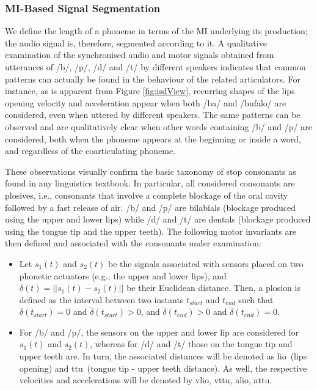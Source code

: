 \documentclass[10pt]{article}
\newcommand{\lio}{\textsf{lio}}
\newcommand{\ttu}{\textsf{ttu}}
\newcommand{\vlio}{\textsf{vlio}}
\newcommand{\vttu}{\textsf{vttu}}
\newcommand{\alio}{\textsf{alio}}
\newcommand{\attu}{\textsf{attu}}
\begin{document}
\subsubsection*{MI-Based Signal Segmentation}
\label{subsec:segm}

We define the length of a phoneme in terms of the MI underlying its production;
the audio signal is, therefore, segmented according to it.
A qualitative examination of the synchronised audio and motor
signals obtained from utterances of /b/, /p/, /d/ and /t/
by different speakers indicates that common patterns can
actually be found in the behaviour of the related articulators.
For instance, as is apparent from Figure \ref{fig:isdView}, 
recurring shapes of the lips opening velocity and acceleration appear
when both /ba/ and /bufalo/ are considered, even when uttered by different
speakers. The same patterns can be observed and are qualitatively clear when other
words containing /b/ and /p/ are considered, both when the phoneme appears at the
beginning or inside a word, and regardless of the coarticulating phoneme.

These observations visually confirm the basic taxonomy of stop consonants 
as found in any linguistics textbook. In particular, all considered consonants are plosives,
i.e., consonants that involve a complete blockage of the oral cavity followed by a fast
release of air. /b/ and /p/ are bilabials (blockage produced using the upper and lower lips)
while /d/ and /t/ are dentals (blockage produced using the tongue tip and the upper teeth).
The following motor invariants are then defined and associated with the consonants under
examination:

\begin{itemize}

  \item Let $s_1(t)$ and $s_2(t)$ be the signals associated
    with sensors placed on two phonetic actuators (e.g., the upper and
    lower lips), and $\delta(t) = ||s_1(t)-s_2(t)||$ be their
    Euclidean distance. Then, a plosion is defined as the interval
    between two instants $t_{start}$ and $t_{end}$ such that
    $\dot{\delta}(t_{start}) = 0 $ and $\ddot{\delta}(t_{start}) > 0$,
    and $\dot{\delta}(t_{end}) > 0 $ and $\ddot{\delta}(t_{end}) = 0$.

  \item For /b/ and /p/, the sensors on the upper and lower
    lip are considered for $s_1(t)$ and $s_2(t)$, whereas for /d/ and /t/
    those on the tongue tip and upper teeth are. In turn, the associated
    distances will be denoted as \lio\ (lips opening) and \ttu\
    (tongue tip - upper teeth distance). As well, the respective velocities
    and accelerations will be denoted by \vlio, \vttu, \alio, \attu.

\end{itemize}
\end{document}
